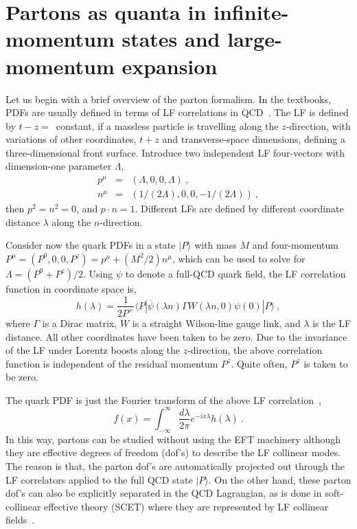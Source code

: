 \section{Partons as quanta in infinite-momentum states and
large-momentum expansion}
\label{sec:imf}

Let us begin with a brief overview of the parton formalism. In the textbooks, PDFs are usually defined in terms of
LF correlations in QCD~\cite{Sterman:1994ce,Collins:2011zzd}.
The LF is defined by $t-z=$~constant, if a massless particle
is travelling along the $z$-direction, with variations of other
coordinates, $t+z$ and transverse-space dimensions, defining
a three-dimensional front surface.
Introduce two independent LF four-vectors with dimension-one
parameter $\Lambda$,
\begin{eqnarray}
   p^\mu &=& (\Lambda, 0, 0, \Lambda )\ , \nonumber \\
   n^\mu &=& \left(1/(2\Lambda), 0, 0, -1/(2\Lambda)\right)\ ,
\end{eqnarray}
then $p^2=n^2=0$, and $p\cdot n=1$. Different LFs
are defined by different coordinate distance $\lambda$
along the $n$-direction.

Consider now the quark PDFs in a state
$|P\rangle$ with mass $M$ and four-momentum $P^\mu= (P^0,0,0,P^z)
= p^\mu + (M^2/2) n^\mu$, which can be used to solve for $\Lambda =(P^0+P^z)/2$.
Using $\psi$ to denote a full-QCD quark field,
the LF correlation function in coordinate space is,
\begin{equation}
     h(\lambda)= \frac{1}{2P^+}\langle P|\overline \psi(\lambda n)\Gamma W(\lambda n, 0)\psi(0)|P\rangle \ ,
\label{Eq:correlationm}
\end{equation}
where $\Gamma$ is a Dirac matrix, $W$ is a straight Wilson-line gauge link,
and $\lambda$ is the LF distance. All other coordinates have been taken
to be zero. Due to the invariance of the LF under Lorentz boosts along the $z$-direction, the
above correlation function is independent of the residual momentum $P^z$. Quite often, $P^z$ is taken to be zero.

The quark PDF is just the Fourier transform of the above LF correlation~\cite{Collins:2011zzd},
\begin{equation}
     f(x) =\int^\infty_{-\infty} \frac{d\lambda}{2\pi} e^{-ix\lambda}h(\lambda)  \ .
\end{equation}
In this way, partons can be studied without using the EFT machinery although they are effective degrees of freedom (dof's)
to describe the LF collinear modes. The reason is that, the parton dof's are automatically projected out through the LF correlators applied to the full QCD state $|P\rangle$.
On the other hand, these parton dof's can also be explicitly separated in the QCD Lagrangian, as is done in soft-collinear effective theory (SCET) where they are represented by LF collinear
fields~\cite{Bauer:2000yr,Bauer:2001ct,Bauer:2001yt}.

